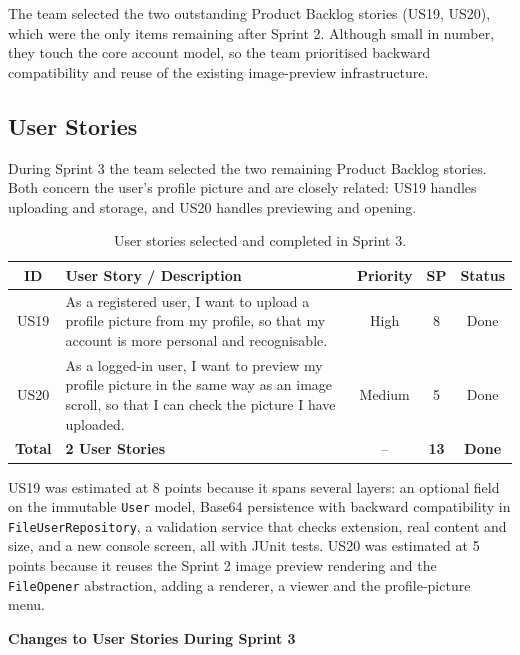 \documentclass[a4paper,11pt]{article}
\renewcommand{\arraystretch}{1.5}
\begin{document}
The team selected the two outstanding Product Backlog stories (US19, US20), which were the only items remaining after Sprint 2. Although small in number, they touch the core account model, so the team prioritised backward compatibility and reuse of the existing image-preview infrastructure.

\subsection{User Stories}

During Sprint 3 the team selected the two remaining Product Backlog stories. Both concern the user's profile picture and are closely related: US19 handles uploading and storage, and US20 handles previewing and opening.

\begin{table}[H]
\centering
\small
\renewcommand{\arraystretch}{1.3}
\begin{tabularx}{\textwidth}{|c|X|c|c|c|}
\hline
\textbf{ID} & \textbf{User Story / Description} & \textbf{Priority} & \textbf{SP} & \textbf{Status} \\
\hline
US19 & As a registered user, I want to upload a profile picture from my profile, so that my account is more personal and recognisable. & High & 8 & Done \\
\hline
US20 & As a logged-in user, I want to preview my profile picture in the same way as an image scroll, so that I can check the picture I have uploaded. & Medium & 5 & Done \\
\hline
\textbf{Total} & \textbf{2 User Stories} & -- & \textbf{13} & \textbf{Done} \\
\hline
\end{tabularx}
\caption{User stories selected and completed in Sprint 3.}
\label{tab:sprint3-stories}
\end{table}

US19 was estimated at 8 points because it spans several layers: an optional field on the immutable \texttt{User} model, Base64 persistence with backward compatibility in \texttt{FileUserRepository}, a validation service that checks extension, real content and size, and a new console screen, all with JUnit tests. US20 was estimated at 5 points because it reuses the Sprint 2 image preview rendering and the \texttt{FileOpener} abstraction, adding a renderer, a viewer and the profile-picture menu.

\vspace{0.5cm}
\noindent\textbf{Changes to User Stories During Sprint 3}\par
\end{document}
